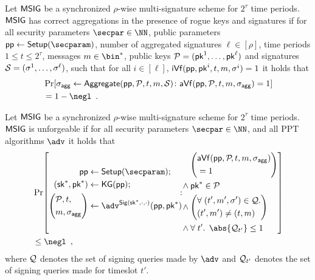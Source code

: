 \begin{definition}
  Let $\mathsf{MSIG}$ be a synchronized $\rho$-wise multi-signature scheme for $2^\tau$ time periods.
  $\mathsf{MSIG}$ has correct aggregations in the presence of rogue keys and signatures if for all security parameters $\secpar\in\NN$, public parameters $\params\gets\setup(\secparam)$, number of aggregated signatures $\ell\in[\rho]$, time periods $1\leq t \leq 2^\tau$, messages $m\in\bin^*$, public keys $\mathcal{P} = (\mathsf{pk}^1,\dots,\mathsf{pk}^\ell)$ and signatures $\mathcal{S} = (\sigma^1,\dots,\sigma^\ell)$, such that for all $i\in[\ell]$, $\mathsf{iVf}(\mathsf{pp},\mathsf{pk}^i,t,m,\sigma^i) = 1$ it holds that
  \begin{align*}
    &\Pr[\aggsig\gets\aggregate(\params,\pubkeys,t,m,\signatures)\colon \averify(\params,\pubkeys,t,m,\aggsig)=1]\\ &=1-\negl\enspace.
  \end{align*}
\end{definition}

\begin{definition}[Unforgeability]\label{def:multisigunforge}
  Let $\mathsf{MSIG}$ be a synchronized $\rho$-wise multi-signature scheme for $2^\tau$ time periods.
  $\mathsf{MSIG}$ is unforgeable if for all security parameters $\secpar\in\NN$, and all PPT algorithms $\adv$ it holds that
\[
  \begin{aligned}
  &\Pr\mleft[\begin{aligned}
  \params\gets{}&\setup(\secparam);\\
  (\sk^*,\pk^*)\gets{}&\kgen(\params);\\
  \mleft(
  \begin{aligned}
  &\pubkeys,t,\\&m,\aggsig
  \end{aligned}
  \mright)\gets{}&\adv^{\sign(\sk^*,\cdot,\cdot)}(\params,\pk^*)
  \end{aligned}\!\!\colon\!\!\!\!
  \begin{aligned}
  &\mleft(\begin{aligned}
  &\averify(\params,\pubkeys\!,t,m,\aggsig)\\&=1
  \end{aligned}\mright)\\
  {}\land{}&\pk^*\in\pubkeys\\
  {}\land{}&\mleft(\begin{aligned}
  &\forall\; (t',m',\sigma') \in\queries\ldotp\\&(t',m') \neq (t,m)
  \end{aligned}\mright)\\
  {}\land{}&\forall\; t' \ldotp\;\abs{\queries_{t'}}\leq 1
  \end{aligned}\mright]\\
  &\leq \negl\enspace,
  \end{aligned}
\]
where $\mathcal{Q}$ denotes the set of signing queries made by $\adv$ and $\mathcal{Q}_{t'}$ denotes the set of signing queries made for timeslot $t'$.
\end{definition}

